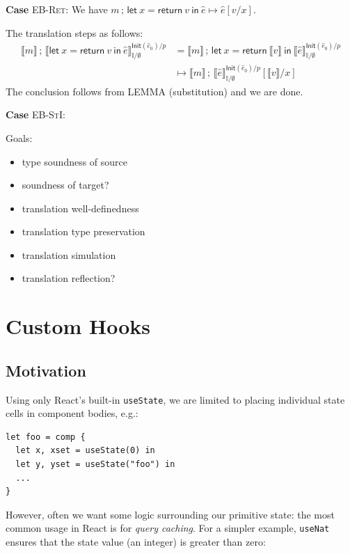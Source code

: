 \documentclass{article}
\newcommand{\mf}[1]{\mathsf{#1}}
\newcommand{\tb}[1]{\textbf{#1}}
\newcommand{\ts}[1]{\textsc{#1}}
\newcommand{\semi}{\,;\,}
\newcommand{\llrr}[1]{\llbracket #1 \rrbracket}
\newcommand{\I}{\mathbb{I}}
\newcommand{\elet}[3]{\mf{let}\ #1 = #2\ \mf{in}\ #3}
\newcommand{\eret}[1]{\mf{return}\ #1}
\begin{document}
\begin{theorem}
\begin{Proof}
\tb{Case} \ts{EB-Ret}: We have
$m \semi \elet{x}{\eret{v}}{\hat{e}} \mapsto \hat{e}[v/x]$.

The translation steps as follows:
\begin{align*}
\llrr{m} \semi \llrr{\elet{x}{\eret{v}}
\hat{e}}^{\mf{Init}(\hat{e}_0)/p}_{\I/\emptyset}
&=
\llrr{m} \semi \elet{x}{\eret{\llrr{v}}}
\llrr{\hat{e}}^{\mf{Init}(\hat{e}_0)/p}_{\I/\emptyset}\\
&\mapsto \llrr{m} \semi
\llrr{\hat{e}}^{\mf{Init}(\hat{e}_0)/p}_{\I/\emptyset}[\llrr{v}/x]
\end{align*}
The conclusion follows from LEMMA (substitution)
and we are done.

\tb{Case} \ts{EB-StI}:

\end{Proof}
\end{theorem}

Goals:
\begin{itemize}
\item type soundness of source
\item soundness of target?
\item translation well-definedness
\item translation type preservation
\item translation simulation
\item translation reflection?
\end{itemize}

\section{Custom Hooks}

\subsection{Motivation}

Using only React's built-in \texttt{useState},
we are limited to placing individual state cells 
in component bodies, e.g.:

\begin{lstlisting}
let foo = comp {
  let x, xset = useState(0) in
  let y, yset = useState("foo") in
  ...
}
\end{lstlisting}

However, often we want some logic surrounding
our primitive state: the most common usage in React
is for \emph{query caching}.
For a simpler example, \texttt{useNat}
ensures that the state value (an integer)
is greater than zero:
\end{document}
